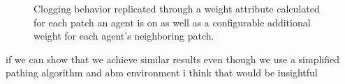 \documentclass[12pt,letterpaper]{article}
\begin{document}
\begin{figure}[!tbp]
  \centering
  \hfill
  \caption{Clogging behavior replicated through a weight attribute calculated for each patch an agent is on as well as a configurable additional weight for each agent's neighboring patch. }
\end{figure}


if we can show that we achieve similar results even though we use a simplified pathing algorithm and abm environment i think that would be insightful
\end{document}
